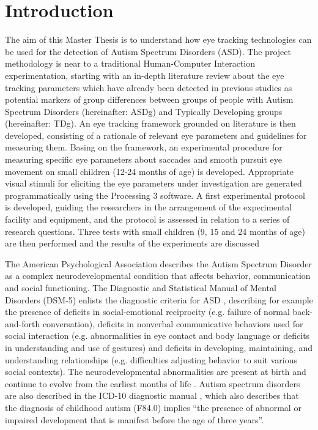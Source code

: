 \chapter{Introduction}
\label{chap:introduction}

The aim of this Master Thesis is to understand how eye tracking technologies can be used for the detection of Autism Spectrum Disorders (ASD). The project methodology is near to a traditional Human-Computer Interaction experimentation, starting with an in-depth literature review about the eye tracking parameters which have already been detected in previous studies as potential markers of group differences between groups of people with Autism Spectrum Disorders (hereinafter: ASDg) and Typically Developing groups (hereinafter: TDg). An eye tracking framework grounded on literature is then developed, consisting of a rationale of relevant eye parameters and guidelines for measuring them. Basing on the framework, an experimental procedure for measuring specific eye parameters about saccades and smooth pursuit eye movement on small children (12-24 months of age) is developed. Appropriate visual stimuli for eliciting the eye parameters under investigation are generated programmatically using the Processing 3 software. A first experimental protocol is developed, guiding the researchers in the arrangement of the experimental facility and equipment, and the protocol is assessed in relation to a series of research questions. Three tests with small children (9, 15 and 24 months of age) are then performed and the results of the experiments are discussed

The American Psychological Association \citep{apa2017diagnosis} describes the Autism Spectrum Disorder as a complex neurodevelopmental condition that affects behavior, communication and social functioning. The Diagnostic and Statistical Manual of Mental Disorders (DSM-5) enlists the diagnostic criteria for ASD \citep{apa2013dsm5}, describing for example the presence of deficits in social-emotional reciprocity (e.g. failure of normal back-and-forth conversation), deficits in nonverbal communicative behaviors used for social interaction (e.g. abnormalities in eye contact and body language or deficits in understanding and use of gestures) and deficits in developing, maintaining, and understanding relationships (e.g. difficulties adjusting behavior to suit various social contexts). The neurodevelopmental abnormalities are present at birth and continue to evolve from the earliest months of life \citep{zwaigenbaum2005behaviorchildren}. Autism spectrum disorders are also described in the ICD-10 diagnostic manual \citep{who2016ICD10}, which also describes that the diagnosis of childhood autism (F84.0) implies “the presence of abnormal or impaired development that is manifest before the age of three years”.

